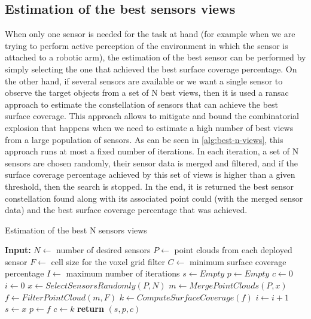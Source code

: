 \subsection{Estimation of the best sensors views}

When only one sensor is needed for the task at hand (for example when we are trying to perform active perception of the environment in which the sensor is attached to a robotic arm), the estimation of the best sensor can be performed by simply selecting the one that achieved the best surface coverage percentage. On the other hand, if several sensors are available or we want a single sensor to observe the target objects from a set of N best views, then it is used a \gls{ransac} approach to estimate the constellation of sensors that can achieve the best surface coverage. This approach allows to mitigate and bound the combinatorial explosion that happens when we need to estimate a high number of best views from a large population of sensors. As can be seen in \cref{alg:best-n-views}, this approach runs at most a fixed number of iterations. In each iteration, a set of N sensors are chosen randomly, their sensor data is merged and filtered, and if the surface coverage percentage achieved by this set of views is higher than a given threshold, then the search is stopped. In the end, it is returned the best sensor constellation found along with its associated point could (with the merged sensor data) and the best surface coverage percentage that was achieved.

\begin{algorithm}
	\caption{Estimation of the best N sensors views}
	\label{alg:best-n-views}
	\begin{algorithmic}[1]
		\State \textbf{Input:}
		\State $N \gets$ number of desired sensors
		\State $P \gets$ point clouds from each deployed sensor
		\State $F \gets$ cell size for the voxel grid filter
		\State $C \gets$ minimum surface coverage percentage
		\State $I \gets$ maximum number of iterations
			\State $s \gets Empty$
			\State $p \gets Empty$
			\State $c \gets 0$
			\State $i \gets 0$
				\State $x \gets SelectSensorsRandomly(P,N)$
				\State $m \gets MergePointClouds(P,x)$
				\State $f \gets FilterPointCloud(m,F)$
				\State $k \gets ComputeSurfaceCoverage(f)$
				\State $i \gets i + 1$
					\State $s \gets x$
					\State $p \gets f$
					\State $c \gets k$
				\EndIf
			\EndWhile
			\State \textbf{return} $(s,p,c)$
		\EndProcedure
	\end{algorithmic}
\end{algorithm}
